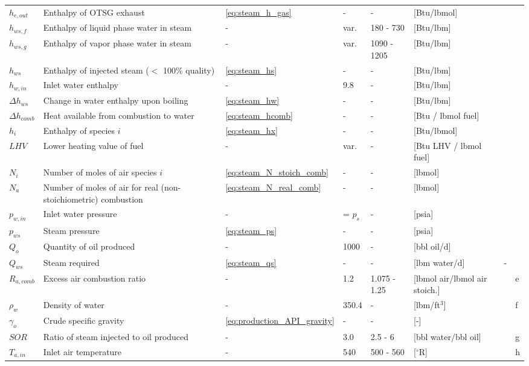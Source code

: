 \documentclass[11pt]{report}
\begin{document}
\begin{landscape}
\begin{scriptsize}
\begin{supertabular*}{1\columnwidth}{p{0.05\columnwidth}p{0.3\columnwidth}p{0.05\columnwidth}p{0.05\columnwidth}p{0.1\columnwidth}p{0.17\columnwidth}p{0.1\columnwidth}p{0.04\columnwidth}}
$h_{e,out} $ & Enthalpy of OTSG exhaust & \eqref{eq:steam_h_gas} & - & - & [Btu/lbmol] & & \\
$h_{ws,f}$ & Enthalpy of liquid phase water in steam & - & var. & 180 - 730 & [Btu/lbm] & & \\
$h_{ws,g}$ & Enthalpy of vapor phase water in steam & - & var. & 1090 - 1205 & [Btu/lbm] & & \\
$h_{ws}$ & Enthalpy of injected steam ($<$ 100\% quality) & \eqref{eq:steam_hs} & - & - & [Btu/lbm] & &\\
$h_{w,in}$ & Inlet water enthalpy & - & 9.8 & - & [Btu/lbm] & &\\
$\Delta h_{ws}$ & Change in water enthalpy upon boiling & \eqref{eq:steam_hw} & - & - & [Btu/lbm] & &\\
$\Delta h_{comb} $ & Heat available from combustion to water & \eqref{eq:steam_hcomb} & - & - & [Btu / lbmol fuel] & &\\
$h_i $ & Enthalpy of species $i$ & \eqref{eq:steam_hx} & - & - & [Btu/lbmol] & & \\
$LHV$ & Lower heating value of fuel & - & var. & - & [Btu LHV / lbmol fuel] & & \\
$N_i$ & Number of moles of air species $i$ & \eqref{eq:steam_N_stoich_comb}& - & - & [lbmol] & & \\
$N_{a}$ & Number of moles of air for real (non-stoichiometric) combustion & \eqref{eq:steam_N_real_comb} & - & - & [lbmol] & &\\
$p_{w,in}$ & Inlet water pressure & - & = $p_s$ & - & [psia] & &\\
$p_{ws}$ & Steam pressure & \eqref{eq:steam_ps} & - & - & [psia] & &\\
$Q_o$ & Quantity of oil produced & - &1000 & - & [bbl oil/d] & & \\
$Q_{ws}$ & Steam required & \eqref{eq:steam_qs} & - & - & [lbm water/d] & - & \\
$R_{a,comb} $ & Excess air combustion ratio & - & 1.2 & 1.075 - 1.25 & [lbmol air/lbmol air stoich.] & & e \\
$\rho_{w}$ & Density of water & - & 350.4 & - & [lbm/ft$^3$] & \cite{EngToolbox} & f \\
$\gamma_o$ &Crude specific gravity &\eqref{eq:production_API_gravity}& - & - & [-] & & \\
$SOR$ & Ratio of steam injected to oil produced & - & 3.0 & 2.5 - 6 & [bbl water/bbl oil] & \cite{DOGGR2011, ERCB2011a} &g \\ 
$T_{a,in} $ & Inlet air temperature & - & 540 & 500 - 560 & [$^\circ$R] & & h \\

\end{supertabular*}
\end{scriptsize}
\end{landscape}
\end{document}
